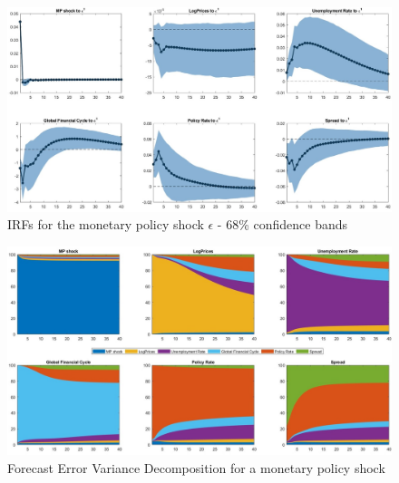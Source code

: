 \documentclass[11pt,a4paper]{article}
\begin{document}
\begin{figure}[H]
    \centering
    \includegraphics[scale=.38]{Graphs/IRF68_MPshock_3lags.jpg}
    \caption{IRFs for the monetary policy shock $\epsilon$ - 68\% confidence bands}
    \label{fig:IRF68_MPshock}
\end{figure}
\begin{figure}[H]
    \centering
    \includegraphics[scale=.38]{Graphs/FEVD_MPshock.jpg}
    \caption{Forecast Error Variance Decomposition for a monetary policy shock}
    \label{fig:FEVD_MPshock}
\end{figure}
\end{document}

